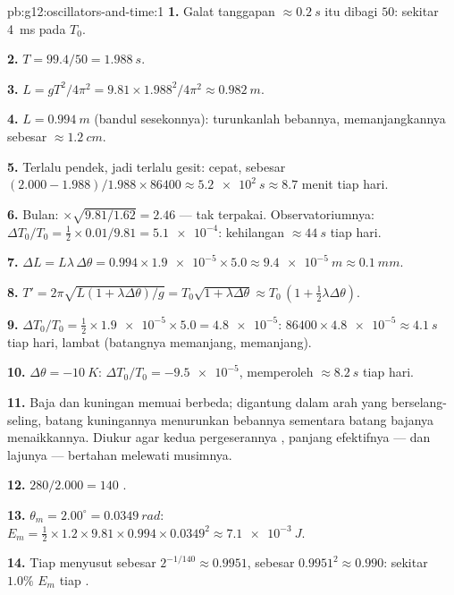 \begin{solution}{pb:g12:oscillators-and-time:1}
\textbf{1.} Galat tanggapan $\approx \qty{0.2}{s}$ itu dibagi
$50$: sekitar \qty{4}{ms} pada $T_0$.

\textbf{2.} $T = 99.4/50 = \qty{1.988}{s}$.

\textbf{3.} $L = gT^2/4\pi^2 = 9.81 \times 1.988^2/4\pi^2 \approx
\qty{0.982}{m}$.

\textbf{4.} $L = \qty{0.994}{m}$ (bandul sesekonnya): turunkanlah
bebannya, memanjangkannya sebesar $\approx \qty{1.2}{cm}$.

\textbf{5.} Terlalu pendek, jadi terlalu gesit: cepat, sebesar $(2.000 -
1.988)/1.988 \times 86400 \approx \qty{5.2e2}{s} \approx 8.7$
menit tiap hari.

\textbf{6.} Bulan: $\times\sqrt{9.81/1.62} = 2.46$ --- tak terpakai.
Observatoriumnya: $\Delta T_0/T_0 = \tfrac12 \times 0.01/9.81 =
\num{5.1e-4}$: kehilangan $\approx \qty{44}{s}$ tiap hari.

\textbf{7.} $\Delta L = L\lambda\,\Delta\theta = 0.994 \times
\num{1.9e-5} \times 5.0 \approx \qty{9.4e-5}{m} \approx
\qty{0.1}{mm}$.

\textbf{8.} $T' = 2\pi\sqrt{L(1 + \lambda\Delta\theta)/g} =
T_0\sqrt{1 + \lambda\Delta\theta} \approx T_0\,(1 + \tfrac12
\lambda\Delta\theta)$.

\textbf{9.} $\Delta T_0/T_0 = \tfrac12 \times \num{1.9e-5} \times
5.0 = \num{4.8e-5}$: $86400 \times \num{4.8e-5} \approx
\qty{4.1}{s}$ tiap hari, lambat (batangnya memanjang,  memanjang).

\textbf{10.} $\Delta\theta = \qty{-10}{K}$: $\Delta T_0/T_0 =
\num{-9.5e-5}$, memperoleh $\approx \qty{8.2}{s}$ tiap hari.

\textbf{11.} Baja dan kuningan memuai berbeda; digantung dalam arah yang
berselang-seling, batang kuningannya menurunkan bebannya sementara batang
bajanya menaikkannya. Diukur agar kedua pergeserannya ,
panjang efektifnya --- dan lajunya --- bertahan melewati musimnya.

\textbf{12.} $280/2.000 = 140$ .

\textbf{13.} $\theta_m = 2.00^\circ = \qty{0.0349}{rad}$: $E_m =
\tfrac12 \times 1.2 \times 9.81 \times 0.994 \times 0.0349^2 \approx
\qty{7.1e-3}{J}$.

\textbf{14.} Tiap   menyusut sebesar $2^{-1/140} \approx
0.9951$,  sebesar $0.9951^2 \approx 0.990$: sekitar $1.0\%$
$E_m$ tiap .


\end{solution}

